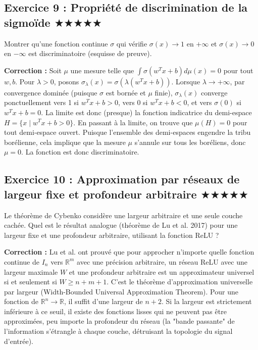\documentclass[11pt,a4paper]{article}
\begin{document}
\vspace{1cm}
\subsection*{Exercice 9 : Propriété de discrimination de la sigmoïde \quad $\bigstar\bigstar\bigstar\bigstar\bigstar$}

Montrer qu'une fonction continue $\sigma$ qui vérifie $\sigma(x) \to 1$ en $+\infty$ et $\sigma(x) \to 0$ en $-\infty$ est discriminatoire (esquisse de preuve).

\textbf{Correction :}
Soit $\mu$ une mesure telle que $\int \sigma(w^T x + b) d\mu(x) = 0$ pour tout $w, b$.
Pour $\lambda > 0$, posons $\sigma_\lambda(x) = \sigma(\lambda(w^T x + b))$.
Lorsque $\lambda \to +\infty$, par convergence dominée (puisque $\sigma$ est bornée et $\mu$ finie), $\sigma_\lambda(x)$ converge ponctuellement vers 1 si $w^T x + b > 0$, vers 0 si $w^T x + b < 0$, et vers $\sigma(0)$ si $w^T x + b = 0$.
La limite est donc (presque) la fonction indicatrice du demi-espace $H = \{x \mid w^T x + b > 0\}$.
En passant à la limite, on trouve que $\mu(H) = 0$ pour tout demi-espace ouvert.
Puisque l'ensemble des demi-espaces engendre la tribu borélienne, cela implique que la mesure $\mu$ s'annule sur tous les boréliens, donc $\mu = 0$. La fonction est donc discriminatoire.


\vspace{1cm}
\subsection*{Exercice 10 : Approximation par réseaux de largeur fixe et profondeur arbitraire \quad $\bigstar\bigstar\bigstar\bigstar\bigstar$}

Le théorème de Cybenko considère une largeur arbitraire et une seule couche cachée. Quel est le résultat analogue (théorème de Lu et al. 2017) pour une largeur fixe et une profondeur arbitraire, utilisant la fonction ReLU ?

\textbf{Correction :}
Lu et al. ont prouvé que pour approcher n'importe quelle fonction continue de $I_n$ vers $\mathbb{R}^m$ avec une précision arbitraire, un réseau ReLU avec une largeur maximale $W$ et une profondeur arbitraire est un approximateur universel si et seulement si $W \ge n + m + 1$.
C'est le théorème d'approximation universelle par largeur (Width-Bounded Universal Approximation Theorem).
Pour une fonction de $\mathbb{R}^n \to \mathbb{R}$, il suffit d'une largeur de $n+2$. Si la largeur est strictement inférieure à ce seuil, il existe des fonctions lisses qui ne peuvent pas être approximées, peu importe la profondeur du réseau (la "bande passante" de l'information s'étrangle à chaque couche, détruisant la topologie du signal d'entrée).
\end{document}
